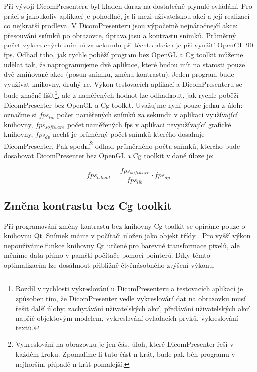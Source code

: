 Při vývoji DicomPresenteru byl kladen důraz na dostatečně plynulé ovládání. Pro práci s jakoukoliv aplikací je pohodlné, je-li mezi uživatelskou akcí a její realizací co nejkratší prodleva. V DicomPresenteru jsou výpočetně nejnáročnejčí akce: přesouvání snímků po obrazovce, úprava jasu a kontrastu snímků. Průměrný počet vykreslených snímků za sekundu při těchto akcích je při využití OpenGL 90 fps. Odhad toho, jak rychle poběží program bez OpenGL a Cg toolkit můžeme udělat tak, že naprogramujeme dvě aplikace, které budou mít na starosti pouze dvě zmiňované akce (posun snímku, změnu kontrastu). Jeden program bude využívat knihovny, druhý ne. Výkon testovacích aplikací a DicomPresenteru se bude značně lišit\footnote{Rozdíl v rychlosti vykreslování u DicomPresenteru a testovacích aplikací je způsoben tím, že DicomPresenter vedle vykreslování dat na obrazovku musí řešit další úlohy: zachytávání uživatelských akcí, předávání uživatelských akcí napříč objektovým modelem, vykreslování ovladacích prvků, vykreslování textů.}, ale z naměřených hodnot lze odhadnout, jak rychle poběží DicomPresenter bez OpenGL a Cg toolkit. Uvažujme nyní pouze jednu z úloh: označme si $fps_{lib}$ počet naměřených snímků za sekundu v aplikaci využívající knihovny, $fps_{software}$ počet naměřených fps v aplikaci nevyužívající grafické knihovny, $fps_{dp}$ nechť je průměrný počet snímků kterého dosahuje DicomPresenter. Pak spodní\footnote{Vykreslování na obrazovku je jen část úloh, které DicomPresenter řeší v každém kroku. Zpomalíme-li tuto část n-krát, bude pak běh programu v nejhorším případě n-krát pomalejší.} odhad průměrného počtu snímků, kterého bude dosahovat DicomPresenter bez OpenGL a Cg toolkit v dané úloze je:

\begin{equation} \label{estimate}
fps_{odhad} = \frac{fps_{software}}{fps_{lib}} \cdot fps_{dp}
\end{equation}

\subsection{Změna kontrastu bez Cg toolkit}
Při programování změny kontrastu bez knihovny Cg toolkit se opíráme pouze o knihovnu Qt. Snímek máme v počítači uložen jako objekt třídy . Pro vyšší výkon nepoužíváme funkce knihovny Qt určené pro barevné transformace pixelů, ale měníme data přímo v paměti počítače pomocí pointerů. Díky těmto optimalizacím lze dosáhnout přibližně čtyřnásobného zvýšení výkonu.


